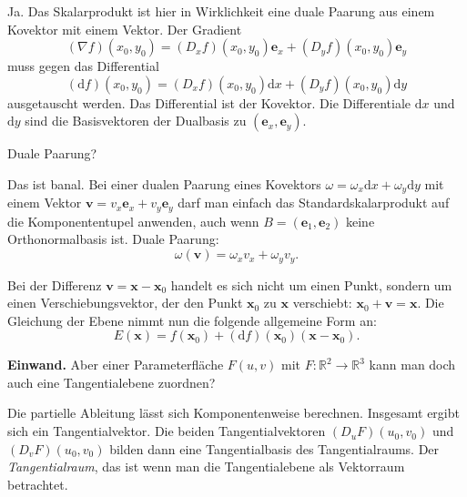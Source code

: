 \documentclass{beamer}
\newcommand{\R}{\mathbb R}
\begin{document}
\begin{frame}
Ja. Das Skalarprodukt ist hier in Wirklichkeit eine duale Paarung aus
einem Kovektor mit einem Vektor. Der Gradient
\[(\nabla f)(x_0,y_0) = (D_x f)(x_0,y_0)\mathbf e_x + (D_y f)(x_0,y_0)\mathbf e_y\]
muss gegen das Differential
\[(\mathrm df)(x_0,y_0) = (D_x f)(x_0,y_0)\mathrm dx + (D_y f)(x_0,y_0)\mathrm dy\]
ausgetauscht werden. Das Differential ist der Kovektor.
Die Differentiale $\mathrm dx$ und $\mathrm dy$
sind die Basisvektoren der Dualbasis zu $(\mathbf e_x,\mathbf e_y)$.
\end{frame}

\begin{frame}
Duale Paarung?
\end{frame}

\begin{frame}
Das ist banal. Bei einer dualen Paarung eines Kovektors
$\omega=\omega_x\mathrm dx+\omega_y\mathrm dy$ mit
einem Vektor $\mathbf v = v_x\mathbf e_x+v_y\mathbf e_y$ darf man einfach
das Standardskalarprodukt auf die Komponententupel anwenden, auch
wenn $B=(\mathbf e_1,\mathbf e_2)$ keine Orthonormalbasis ist.
Duale Paarung:
\[\omega(\mathbf v) = \omega_x v_x+\omega_y v_y.\]
\end{frame}

\begin{frame}
Bei der Differenz $\mathbf v=\mathbf x-\mathbf x_0$ handelt es sich nicht
um einen Punkt, sondern um einen Verschiebungsvektor, der den Punkt
$\mathbf x_0$ zu $\mathbf x$ verschiebt: $\mathbf x_0+\mathbf v = \mathbf x$.
Die Gleichung der Ebene nimmt nun die folgende allgemeine Form an:
\[E(\mathbf x) = f(\mathbf x_0) + (\mathrm df)(\mathbf x_0)(\mathbf x-\mathbf x_0).\]
\end{frame}

\begin{frame}
\textbf{Einwand.} Aber einer Parameterfläche $F(u,v)$ mit
$F\colon\R^2\to\R^3$ kann man doch auch eine Tangentialebene zuordnen?
\end{frame}

\begin{frame}
Die partielle Ableitung lässt sich Komponentenweise berechnen.
Insgesamt ergibt sich ein Tangentialvektor. Die beiden
Tangentialvektoren $(D_u F)(u_0,v_0)$ und $(D_v F)(u_0,v_0)$
bilden dann eine Tangentialbasis des Tangentialraums. Der
\emph{Tangentialraum}, das ist wenn man die Tangentialebene als
Vektorraum betrachtet.
\end{frame}
\end{document}
